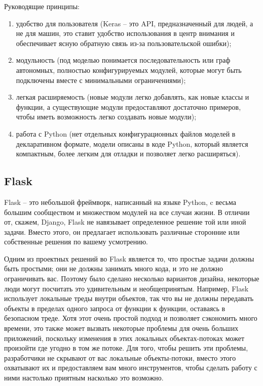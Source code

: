Руководящие принципы:
\begin{enumerate}
  \item удобство для пользователя (Keras -- это API, предназначенный для людей, а не для машин, это ставит удобство использования в центр внимания и обеспечивает ясную обратную связь из-за пользовательской ошибки);
  \item модульность (под моделью понимается последовательность или \linebreak граф автономных, полностью конфигурируемых модулей, которые могут \linebreak быть подключены вместе с минимальными ограничениями);
  \item легкая расширяемость (новые модули легко добавлять, как новые классы и функции, а существующие модули предоставляют достаточно примеров, чтобы иметь возможность легко создавать новые модули);
  \item работа с Python (нет отдельных конфигурационных файлов моделей в декларативном формате, модели описаны в коде Python, который является компактным, более легким для отладки и позволяет легко расширяться).
\end{enumerate}

\subsection{Flask}
\label{sec:development:flask}

Flask -- это небольшой фреймворк, написанный на языке Python, c весьма большим сообществом и множеством модулей на все случаи жизни. В отличии от, скажем, Django, Flask не навязывает определенное решение той или иной задачи. Вместо этого, он предлагает использовать различные сторонние или собственные решения по вашему усмотрению.

Одним из проектных решений во Flask является то, что простые задачи должны быть простыми; они не должны занимать много кода, и это не должно ограничивать вас. Поэтому было сделано несколько вариантов дизайна, некоторые люди могут посчитать это удивительным и необщепринятым. Например, Flask использует локальные треды внутри объектов, так что вы не должны передавать объекты в пределах одного запроса от функции к функции, оставаясь в безопасном треде. Хотя этот очень простой подход и позволяет сэкономить много времени, это также может вызвать некоторые проблемы для очень больших приложений, поскольку изменения в этих локальных объектах-потоках может произойти где угодно в том же потоке. Для того, чтобы решить эти проблемы, разработчики не скрывают от вас локальные объекты-потоки, вместо этого охватывают их и предоставляем вам много инструментов, чтобы сделать работу с ними настолько приятным насколько это возможно.

